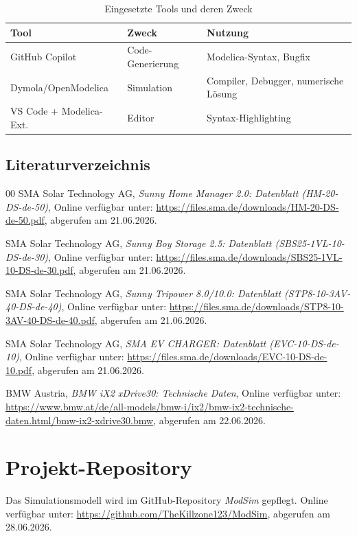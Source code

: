 \documentclass[conference]{IEEEtran}
\begin{document}
\begin{table}[h]
\caption{Eingesetzte Tools und deren Zweck}
\centering
\footnotesize
\begin{tabularx}{\columnwidth}{@{}p{2.0cm}p{1.8cm}X@{}}
\toprule
\textbf{Tool} & \textbf{Zweck} & \textbf{Nutzung} \\
\midrule
GitHub Copilot & Code-Generierung & Modelica-Syntax, Bugfix \\
Dymola/\newline OpenModelica & Simulation & Compiler, Debugger, numerische Lösung \\
VS Code + Modelica-Ext. & Editor & Syntax-Highlighting \\
\bottomrule
\end{tabularx}
\end{table}

\subsection{Literaturverzeichnis}

\begin{thebibliography}{00}
SMA Solar Technology AG, \textit{Sunny Home Manager 2.0: Datenblatt (HM-20-DS-de-50)},
Online verfügbar unter: \url{https://files.sma.de/downloads/HM-20-DS-de-50.pdf},
abgerufen am 21.06.2026.

SMA Solar Technology AG, \textit{Sunny Boy Storage 2.5: Datenblatt (SBS25-1VL-10-DS-de-30)},
Online verfügbar unter: \url{https://files.sma.de/downloads/SBS25-1VL-10-DS-de-30.pdf},
abgerufen am 21.06.2026.

SMA Solar Technology AG, \textit{Sunny Tripower 8.0/10.0: Datenblatt (STP8-10-3AV-40-DS-de-40)},
Online verfügbar unter: \url{https://files.sma.de/downloads/STP8-10-3AV-40-DS-de-40.pdf},
abgerufen am 21.06.2026.

SMA Solar Technology AG, \textit{SMA EV CHARGER: Datenblatt (EVC-10-DS-de-10)},
Online verfügbar unter: \url{https://files.sma.de/downloads/EVC-10-DS-de-10.pdf},
abgerufen am 21.06.2026.

BMW Austria, \textit{BMW iX2 xDrive30: Technische Daten},
Online verfügbar unter: \url{https://www.bmw.at/de/all-models/bmw-i/ix2/bmw-ix2-technische-daten.html/bmw-ix2-xdrive30.bmw},
abgerufen am 22.06.2026.
\end{thebibliography}

\appendix

\section{Projekt-Repository}
\label{app:projekt_repository}
Das Simulationsmodell wird im GitHub-Repository \textit{ModSim} gepflegt.
Online verfügbar unter: \url{https://github.com/TheKillzone123/ModSim},
abgerufen am 28.06.2026.
\end{document}
